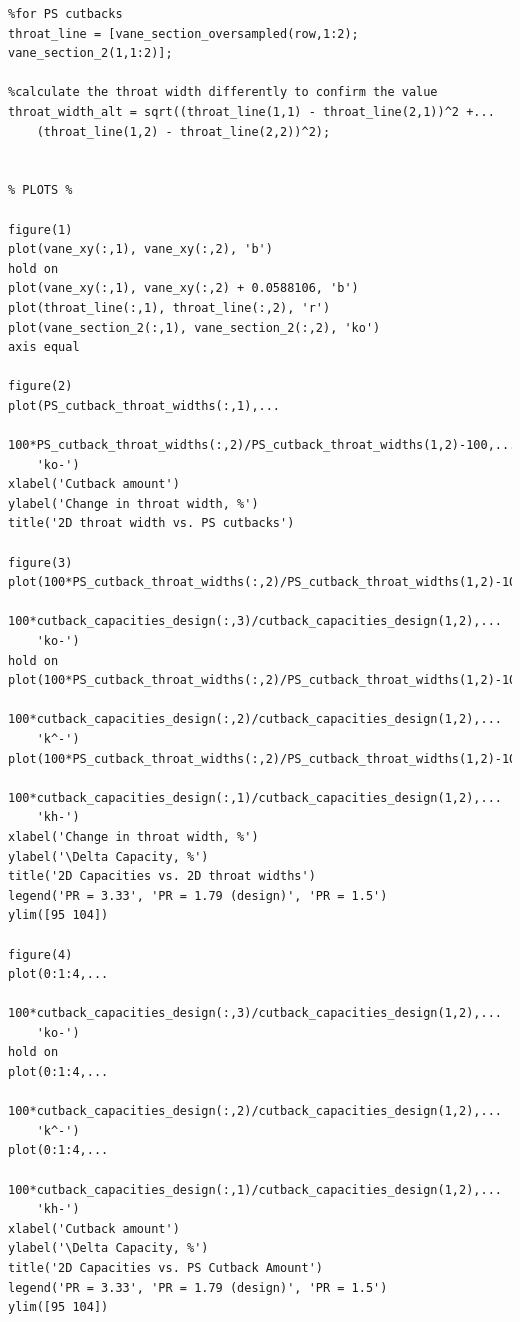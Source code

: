 \documentclass[a4paper, 11pt, oneside]{report}
\begin{document}
\begin{verbatim}
%for PS cutbacks
throat_line = [vane_section_oversampled(row,1:2); vane_section_2(1,1:2)];

%calculate the throat width differently to confirm the value
throat_width_alt = sqrt((throat_line(1,1) - throat_line(2,1))^2 +...
    (throat_line(1,2) - throat_line(2,2))^2);


% PLOTS %

figure(1)
plot(vane_xy(:,1), vane_xy(:,2), 'b')
hold on
plot(vane_xy(:,1), vane_xy(:,2) + 0.0588106, 'b')
plot(throat_line(:,1), throat_line(:,2), 'r')
plot(vane_section_2(:,1), vane_section_2(:,2), 'ko')
axis equal

figure(2)
plot(PS_cutback_throat_widths(:,1),...
    100*PS_cutback_throat_widths(:,2)/PS_cutback_throat_widths(1,2)-100,...
    'ko-')
xlabel('Cutback amount')
ylabel('Change in throat width, %')
title('2D throat width vs. PS cutbacks')

figure(3)
plot(100*PS_cutback_throat_widths(:,2)/PS_cutback_throat_widths(1,2)-100,...
    100*cutback_capacities_design(:,3)/cutback_capacities_design(1,2),...
    'ko-')
hold on
plot(100*PS_cutback_throat_widths(:,2)/PS_cutback_throat_widths(1,2)-100,...
    100*cutback_capacities_design(:,2)/cutback_capacities_design(1,2),...
    'k^-')
plot(100*PS_cutback_throat_widths(:,2)/PS_cutback_throat_widths(1,2)-100,...
    100*cutback_capacities_design(:,1)/cutback_capacities_design(1,2),...
    'kh-')
xlabel('Change in throat width, %')
ylabel('\Delta Capacity, %')
title('2D Capacities vs. 2D throat widths')
legend('PR = 3.33', 'PR = 1.79 (design)', 'PR = 1.5')
ylim([95 104])

figure(4)
plot(0:1:4,...
    100*cutback_capacities_design(:,3)/cutback_capacities_design(1,2),...
    'ko-')
hold on
plot(0:1:4,...
    100*cutback_capacities_design(:,2)/cutback_capacities_design(1,2),...
    'k^-')
plot(0:1:4,...
    100*cutback_capacities_design(:,1)/cutback_capacities_design(1,2),...
    'kh-')
xlabel('Cutback amount')
ylabel('\Delta Capacity, %')
title('2D Capacities vs. PS Cutback Amount')
legend('PR = 3.33', 'PR = 1.79 (design)', 'PR = 1.5')
ylim([95 104])
\end{verbatim}
\end{document}
